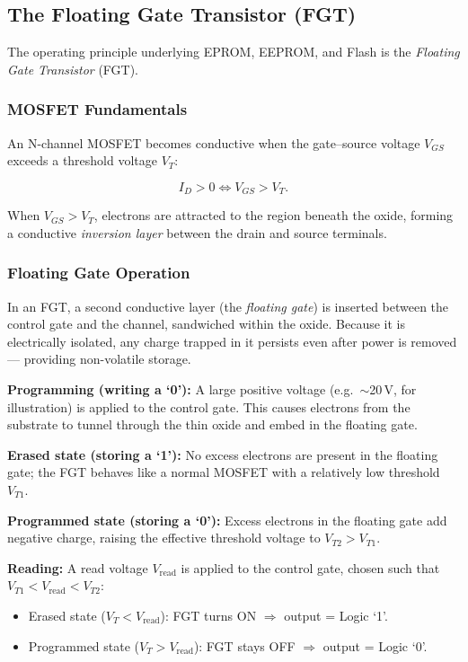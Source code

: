 \documentclass[11pt, a4paper, notitlepage]{report}
\theoremstyle{definition}
\theoremstyle{remark}
\theoremstyle{definition}
\begin{document}
\subsection{The Floating Gate Transistor (FGT)}
\label{sec:fgt}

The operating principle underlying EPROM, EEPROM, and Flash is the \emph{Floating Gate Transistor} (FGT).

\subsubsection{MOSFET Fundamentals}

An N-channel MOSFET becomes conductive when the gate–source voltage $V_{GS}$ exceeds a threshold voltage $V_T$:

\[
  I_D > 0 \iff V_{GS} > V_T.
\]

When $V_{GS} > V_T$, electrons are attracted to the region beneath the oxide, forming a conductive \emph{inversion layer} between the drain and source terminals.

\subsubsection{Floating Gate Operation}

In an FGT, a second conductive layer (the \emph{floating gate}) is inserted between the control gate and the channel, sandwiched within the oxide. Because it is electrically isolated, any charge trapped in it persists even after power is removed — providing non-volatile storage.

\textbf{Programming (writing a `0'):} A large positive voltage (e.g.\ $\sim$20\,V, for illustration) is applied to the control gate. This causes electrons from the substrate to tunnel through the thin oxide and embed in the floating gate.

\textbf{Erased state (storing a `1'):} No excess electrons are present in the floating gate; the FGT behaves like a normal MOSFET with a relatively low threshold $V_{T1}$.

\textbf{Programmed state (storing a `0'):} Excess electrons in the floating gate add negative charge, raising the effective threshold voltage to $V_{T2} > V_{T1}$.

\textbf{Reading:} A read voltage $V_{\text{read}}$ is applied to the control gate, chosen such that $V_{T1} < V_{\text{read}} < V_{T2}$:
\begin{itemize}
  \item Erased state ($V_T < V_{\text{read}}$): FGT turns ON $\Rightarrow$ output = Logic `1'.
  \item Programmed state ($V_T > V_{\text{read}}$): FGT stays OFF $\Rightarrow$ output = Logic `0'.
\end{itemize}
\end{document}
